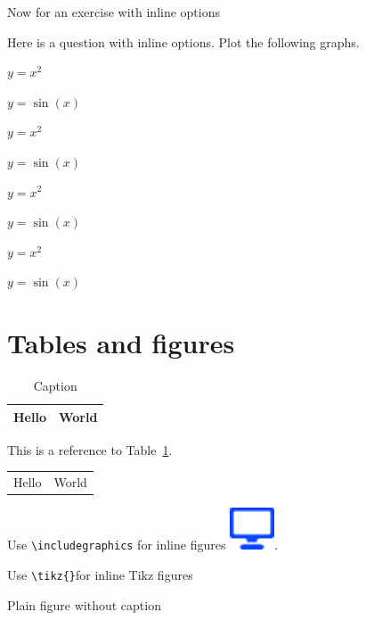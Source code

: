 \documentclass[solutionsatend,twocolumnsolutions]{ouunit}
\begin{document}
Now for an exercise with inline options
\begin{exercise}
Here is a question with inline options. Plot the following graphs.
\begin{enumerate*}
\item $y=x^2$
\item $y=\sin(x)$
\item $y=x^2$
\item $y=\sin(x)$
\item $y=x^2$
\item $y=\sin(x)$
\item $y=x^2$
\item $y=\sin(x)$
\end{enumerate*}
\end{exercise}



\section{Tables and figures}

\lipsum[133]
\begin{table}
\caption{Caption}\label{tab-test}
\begin{tabular}{|l|l|}
\hline
 Hello & World\\
\hline
\end{tabular}
\end{table}

This is a reference to Table~\ref{tab-test}.

\lipsum[133]
\begin{table}
\begin{tabular}{ll}
 Hello & World
\end{tabular}
\end{table}
\lipsum[133]

Use \verb"\includegraphics" for inline figures \includegraphics[height=2ex]{icon}.

Use \verb"\tikz{}"for inline Tikz figures  


Plain figure without caption

\begin{figure}
\end{figure}
\end{document}
